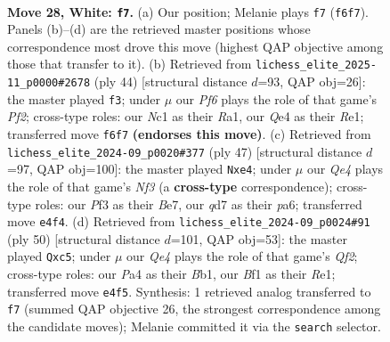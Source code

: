 \documentclass[11pt]{article}
\begin{document}
\clearpage

\begin{figure}[p]\centering
\begin{subfigure}{0.46\textwidth}\centering
\resizebox{\linewidth}{!}{%
\newchessgame
\chessboard[
  setfen={1rb1rk2/3q3p/ppn2P2/2p1p1p1/P3Q3/2P2P2/6PP/1KN1RBNR w - - 2 28},
  showmover=false,
  pgfstyle=straightmove, color=movearrow, markmove={f6-f7}
]}
\caption{}
\end{subfigure}\hfill
\begin{subfigure}{0.46\textwidth}\centering
\resizebox{\linewidth}{!}{%
\newchessgame
\chessboard[
  setfen={r3r1k1/5pp1/p1b2n1p/3q1P2/2pp1B2/Q5NP/PP3PP1/R3R1K1 w - - 1 23},
  showmover=false,
  pgfstyle=straightmove, color=movearrow, markmove={f2-f3}
]}
\caption{}
\end{subfigure}
\\[4pt]
\begin{subfigure}{0.46\textwidth}\centering
\resizebox{\linewidth}{!}{%
\newchessgame
\chessboard[
  setfen={2r3k1/p2rbpp1/Ppq1pn1p/8/1PPpN2P/3Q4/3B1PP1/2R1R1K1 b - - 2 24},
  showmover=false,
  pgfstyle=straightmove, color=movearrow, markmove={f6-e4}
]}
\caption{}
\end{subfigure}\hfill
\begin{subfigure}{0.46\textwidth}\centering
\resizebox{\linewidth}{!}{%
\newchessgame
\chessboard[
  setfen={b4rk1/2p3b1/4q1n1/p1p1p1p1/2P1PpN1/1P5P/P4QP1/1B1RR1K1 w - - 0 26},
  showmover=false,
  pgfstyle=straightmove, color=movearrow, markmove={f2-c5}
]}
\caption{}
\end{subfigure}
\caption{\textbf{Move 28, White: \texttt{f7}.} (a) Our position; Melanie plays \texttt{f7} (\texttt{f6f7}). Panels (b)--(d) are the retrieved master positions whose correspondence most drove this move (highest QAP objective among those that transfer to it). (b) Retrieved from \texttt{lichess\_elite\_2025-11\_p0000\#2678} (ply 44) [structural distance $d$=93, QAP obj=26]: the master played \texttt{f3}; under $\mu$ our \emph{Pf6} plays the role of that game's \emph{Pf2}; cross-type roles: our \emph{N}c1 as their \emph{R}a1, our \emph{Q}e4 as their \emph{R}e1; transferred move \texttt{f6f7} \textbf{(endorses this move)}. (c) Retrieved from \texttt{lichess\_elite\_2024-09\_p0020\#377} (ply 47) [structural distance $d$=97, QAP obj=100]: the master played \texttt{Nxe4}; under $\mu$ our \emph{Qe4} plays the role of that game's \emph{Nf3} (a \textbf{cross-type} correspondence); cross-type roles: our \emph{P}f3 as their \emph{B}e7, our \emph{q}d7 as their \emph{p}a6; transferred move \texttt{e4f4}. (d) Retrieved from \texttt{lichess\_elite\_2024-09\_p0024\#91} (ply 50) [structural distance $d$=101, QAP obj=53]: the master played \texttt{Qxc5}; under $\mu$ our \emph{Qe4} plays the role of that game's \emph{Qf2}; cross-type roles: our \emph{P}a4 as their \emph{B}b1, our \emph{B}f1 as their \emph{R}e1; transferred move \texttt{e4f5}. Synthesis: 1 retrieved analog transferred to \texttt{f7} (summed QAP objective 26, the strongest correspondence among the candidate moves); Melanie committed it via the \texttt{search} selector.}
\label{fig:thought-m54}
\end{figure}
\end{document}
